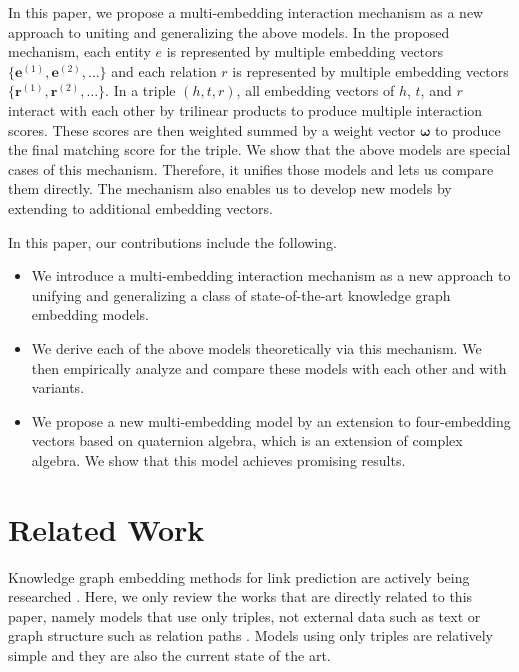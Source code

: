 \documentclass[sigconf,edbt]{acmart-edbt2019}
\def\ve{{\bm{e}}}
\def\vr{{\bm{r}}}
\begin{document}
In this paper, we propose a multi-embedding interaction mechanism as a new approach to uniting and generalizing the above models. In the proposed mechanism, each entity $ e $ is represented by multiple embedding vectors $ \{\ve^{(1)}, \ve^{(2)}, \dots\} $ and each relation $ r $ is represented by multiple embedding vectors $ \{\vr^{(1)}, \vr^{(2)}, \dots\} $. In a triple $ (h, t, r) $, all embedding vectors of $ h $, $ t $, and $ r $ interact with each other by trilinear products to produce multiple interaction scores. These scores are then weighted summed by a weight vector $ \bm{\omega} $ to produce the final matching score for the triple. We show that the above models are special cases of this mechanism. Therefore, it unifies those models and lets us compare them directly. The mechanism also enables us to develop new models by extending to additional embedding vectors.

In this paper, our contributions include the following.
\begin{itemize}
	\item We introduce a multi-embedding interaction mechanism as a new approach to unifying and generalizing a class of state-of-the-art knowledge graph embedding models.
	\item We derive each of the above models theoretically via this mechanism. We then empirically analyze and compare these models with each other and with variants.
	\item We propose a new multi-embedding model by an extension to four-embedding vectors based on quaternion algebra, which is an extension of complex algebra. We show that this model achieves promising results.
\end{itemize}

\section{Related Work} \label{sect:relatedwork}
Knowledge graph embedding methods for link prediction are actively being researched \cite{wang_knowledgegraphembedding_2017}. Here, we only review the works that are directly related to this paper, namely models that use only triples, not external data such as text \cite{wang_knowledgegraphtext_2014} or graph structure such as relation paths \cite{lin_modelingrelationpaths_2015}. Models using only triples are relatively simple and they are also the current state of the art.
\end{document}
